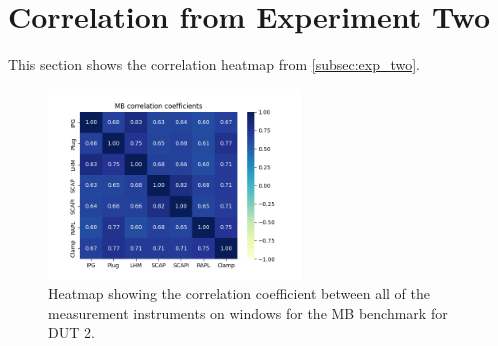 \section*{Correlation from Experiment Two}\label{app:cor_exp_two}

This section shows the correlation heatmap from \cref{subsec:exp_two}.

\begin{figure}[H]
    \centering
    \hspace*{-1cm} %
    \includegraphics[width=0.6\textwidth]{figures/Mandelbrot_ex2.png}
    \caption{Heatmap showing the correlation coefficient between all of the measurement instruments on windows for the MB benchmark for DUT 2.}
    \label{fig:mandelbrotCorrDut2}
\end{figure}